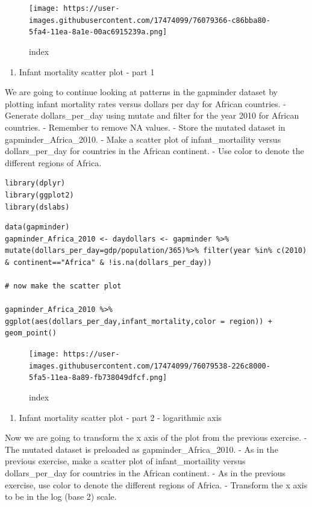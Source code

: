 \documentclass[
]{article}
\providecommand{\tightlist}{%
  \setlength{\itemsep}{0pt}\setlength{\parskip}{0pt}}
\begin{document}
\begin{figure}
\centering
\texttt{[image: https://user-images.githubusercontent.com/17474099/76079366-c86bba80-5fa4-11ea-8a1e-00ac6915239a.png]}
\caption{index}
\end{figure}

\begin{enumerate}
\def\labelenumi{\arabic{enumi}.}
\setcounter{enumi}{10}
\tightlist
\item
  Infant mortality scatter plot - part 1
\end{enumerate}

We are going to continue looking at patterns in the gapminder dataset by
plotting infant mortality rates versus dollars per day for African
countries. - Generate dollars\_per\_day using mutate and filter for the
year 2010 for African countries. - Remember to remove NA values. - Store
the mutated dataset in gapminder\_Africa\_2010. - Make a scatter plot of
infant\_mortaility versus dollars\_per\_day for countries in the African
continent. - Use color to denote the different regions of Africa.

\begin{verbatim}
library(dplyr)
library(ggplot2)
library(dslabs)
\end{verbatim}

\begin{verbatim}
data(gapminder)
gapminder_Africa_2010 <- daydollars <- gapminder %>% mutate(dollars_per_day=gdp/population/365)%>% filter(year %in% c(2010) & continent=="Africa" & !is.na(dollars_per_day))

# now make the scatter plot

gapminder_Africa_2010 %>% ggplot(aes(dollars_per_day,infant_mortality,color = region)) + geom_point()
\end{verbatim}

\begin{figure}
\centering
\texttt{[image: https://user-images.githubusercontent.com/17474099/76079538-226c8000-5fa5-11ea-8a89-fb738049dfcf.png]}
\caption{index}
\end{figure}

\begin{enumerate}
\def\labelenumi{\arabic{enumi}.}
\setcounter{enumi}{11}
\tightlist
\item
  Infant mortality scatter plot - part 2 - logarithmic axis
\end{enumerate}

Now we are going to transform the x axis of the plot from the previous
exercise. - The mutated dataset is preloaded as gapminder\_Africa\_2010.
- As in the previous exercise, make a scatter plot of infant\_mortaility
versus dollars\_per\_day for countries in the African continent. - As in
the previous exercise, use color to denote the different regions of
Africa. - Transform the x axis to be in the log (base 2) scale.
\end{document}
